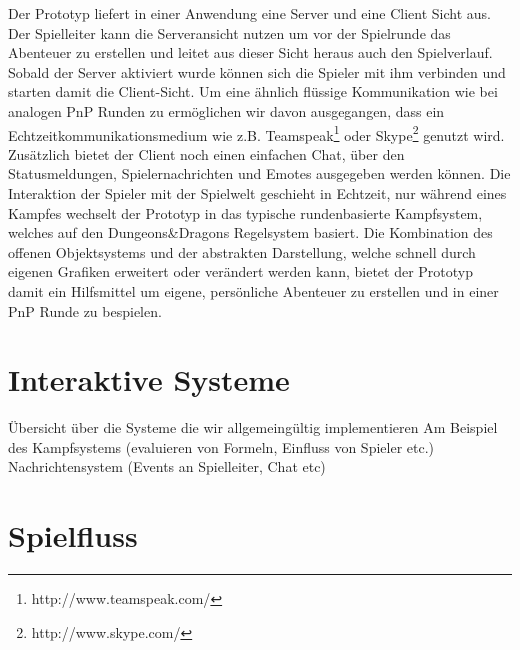 Der Prototyp liefert in einer Anwendung eine Server und eine Client Sicht aus. Der Spielleiter kann die Serveransicht nutzen um vor der Spielrunde das Abenteuer zu erstellen und leitet aus dieser Sicht heraus auch den Spielverlauf. Sobald der Server aktiviert wurde können sich die Spieler mit ihm verbinden und starten damit die Client-Sicht. Um eine ähnlich flüssige Kommunikation wie bei analogen PnP Runden zu ermöglichen wir davon ausgegangen, dass ein Echtzeitkommunikationsmedium wie z.B. Teamspeak\footnote{http://www.teamspeak.com/} oder Skype\footnote{http://www.skype.com/} genutzt wird. Zusätzlich bietet der Client noch einen einfachen Chat, über den Statusmeldungen, Spielernachrichten und Emotes ausgegeben werden können. \newline
Die Interaktion der Spieler mit der Spielwelt geschieht in Echtzeit, nur während eines Kampfes wechselt der Prototyp in das typische rundenbasierte Kampfsystem, welches auf den Dungeons\&Dragons Regelsystem basiert.\newline
Die Kombination des offenen Objektsystems und der abstrakten Darstellung, welche schnell durch eigenen Grafiken erweitert oder verändert werden kann, bietet der Prototyp damit ein Hilfsmittel um eigene, persönliche Abenteuer zu erstellen und in einer PnP Runde zu bespielen.




\section{Interaktive Systeme}
\label{sec:InteraktiveSysteme}
Übersicht über die Systeme die wir allgemeingültig implementieren\newline
Am Beispiel des Kampfsystems (evaluieren von Formeln, Einfluss von Spieler etc.)\newline
Nachrichtensystem (Events an Spielleiter, Chat etc)\newline


\section{Spielfluss}
\label{sec:Spielfluss}


